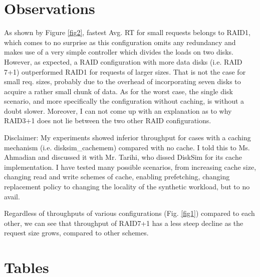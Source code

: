\documentclass[paper=a4, fontsize=11pt]{scrartcl} %
\numberwithin{figure}{section} %
\numberwithin{table}{section} %
\begin{document}
\section{Observations}
As shown by Figure \ref{fig2}, fastest Avg. RT for small requests belongs to RAID1, which comes to no surprise as this configuration omits any redundancy and makes use of a very simple controller which divides the loads on two disks. However, as expected, a RAID configuration with more data disks (i.e. RAID 7+1) outperformed RAID1 for requests of larger sizes. That is not the case for small req. sizes, probably due to the overhead of incorporating seven disks to acquire a rather small chunk of data. As for the worst case, the single disk scenario, and more specifically the configuration without caching, is without a doubt slower. Moreover, I can not come up with an explanation as to why RAID3+1 does not lie between the two other RAID configurations. 

Disclaimer: My experiments showed inferior throughput for cases with a caching mechanism (i.e. disksim\_cachemem) compared with no cache. I told this to Ms. Ahmadian and discussed it with Mr. Tarihi, who dissed DiskSim for its cache implementation. I have tested many possible scenarios, from increasing cache size, changing read and write schemes of cache, enabling prefetching, changing replacement policy to changing the locality of the synthetic workload, but to no avail.

Regardless of throughputs of various configurations (Fig. \ref{fig1}) compared to each other, we can see that throughput of RAID7+1 has a less steep decline as the request size grows, compared to other schemes. 

\section{Tables}
\end{document}
